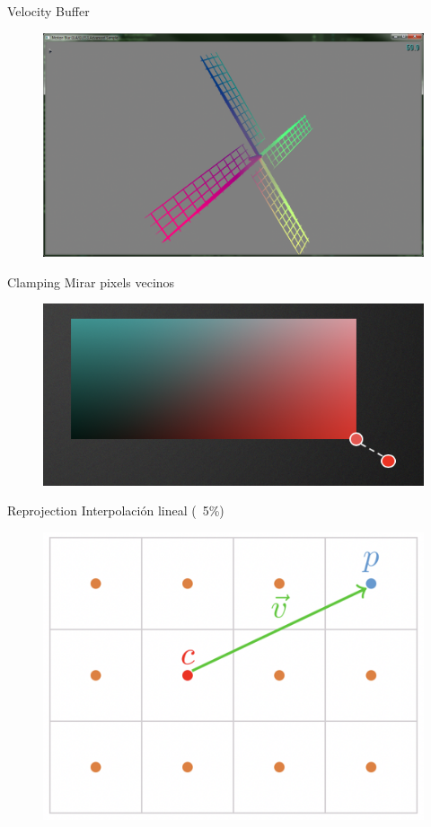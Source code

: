 \documentclass[table]{beamer}
\begin{document}
\begin{frame}[fragile]{Velocity Buffer}
    \begin{figure}
        \includegraphics[width=\linewidth]{./figures/motionbluradvanced_velocity.png}
    \end{figure}
\end{frame}

\begin{frame}[fragile]{Clamping}
    Mirar pixels vecinos

    \begin{figure}
        \includegraphics[width=\linewidth]{./figures/clamp.png}
    \end{figure}
\end{frame}

\begin{frame}[fragile]{Reprojection}
    Interpolación lineal (~5\%)
    \begin{figure}
        \includegraphics[width=.8\linewidth]{./figures/vec.png}
    \end{figure}
\end{frame}
\end{document}
